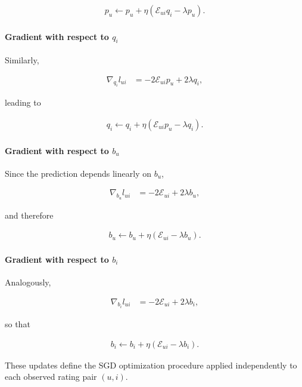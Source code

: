 \documentclass[11pt]{article}
\begin{document}
\begin{appendices}
\begin{align*}
    p_u \leftarrow p_u + \eta(\mathcal{E}_{ui} q_i - \lambda p_u).
\end{align*}

\paragraph{Gradient with respect to $q_i$}

Similarly,

\begin{align*}
    \nabla_{q_i} l_{ui}
    &= -2\mathcal{E}_{ui} p_u + 2\lambda q_i,
\end{align*}

leading to

\begin{align*}
    q_i \leftarrow q_i + \eta(\mathcal{E}_{ui} p_u - \lambda q_i).
\end{align*}

\paragraph{Gradient with respect to $b_u$}

Since the prediction depends linearly on $b_u$,

\begin{align*}
    \nabla_{b_u} l_{ui}
    &= -2\mathcal{E}_{ui} + 2\lambda b_u,
\end{align*}

and therefore

\begin{align*}
    b_u \leftarrow b_u + \eta(\mathcal{E}_{ui} - \lambda b_u).
\end{align*}

\paragraph{Gradient with respect to $b_i$}

Analogously,

\begin{align*}
    \nabla_{b_i} l_{ui}
    &= -2\mathcal{E}_{ui} + 2\lambda b_i,
\end{align*}

so that

\begin{align*}
    b_i \leftarrow b_i + \eta(\mathcal{E}_{ui} - \lambda b_i).
\end{align*}

These updates define the SGD optimization procedure applied independently to each observed rating pair $(u,i)$.


\end{appendices}
\end{document}
